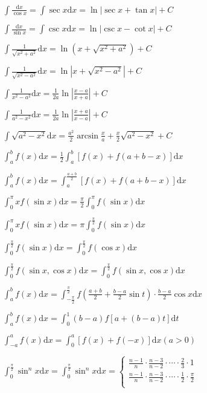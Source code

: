 \begin{spacing}{\hangju}
    \noindent $\int{\frac{\mathrm{d}x}{\cos{x}}} = \int{\sec{x}}\mathrm{d}x = \ln{\left| \sec{x} + \tan{x} \right| } + C$

    \noindent $\int{\frac{\mathrm{d}x}{\sin{x}}} = \int{\csc{x}}\mathrm{d}x = \ln{\left| \csc{x} - \cot{x} \right| } + C$

    \noindent $\int{\frac{1}{\sqrt{x^2 + a^2}}}\mathrm{d}x = \ln{(x + \sqrt{x^2 + a ^2})} + C$

    \noindent $\int{\frac{1}{\sqrt{x^2 - a^2}}}\mathrm{d}x = \ln{\left|x + \sqrt{x^2 - a ^2}\right|} + C$

    \noindent $\int{\frac{1}{x^2 - a^2}} \mathrm{d}x = \frac{1}{2a} \ln{\left| \frac{x - a}{x + a} \right|} + C$

    \noindent $\int{\frac{1}{a^2 - x^2}} \mathrm{d}x = \frac{1}{2a} \ln{\left| \frac{x + a}{x - a} \right|} + C$

    \noindent $\int{\sqrt{a^2 - x^2}}\mathrm{d}x = \frac{a^2}{2}\arcsin{\frac{x}{a}} + \frac{x}{2}\sqrt{a^2 - x^2} + C$

    \noindent $\int_{a}^{b}{f(x)}\mathrm{d}x = \frac{1}{2}\int_{a}^{b}{[f(x) + f(a + b - x)]}\mathrm{d}x$

    \noindent $\int_{a}^{b}{f(x)}\mathrm{d}x = \int_{a}^{\frac{a+b}{2}}{[f(x) + f(a + b - x)]}\mathrm{d}x$

    \noindent $\int_{0}^{\pi}{xf(\sin{x})}\mathrm{d}x = \frac{\pi}{2}\int_{0}^{\pi}{f(\sin{x})}\mathrm{d}x$

    \noindent $\int_{0}^{\pi}{xf(\sin{x})}\mathrm{d}x = \pi\int_{0}^{\frac{\pi}{2}}{f(\sin{x})}\mathrm{d}x$

    \noindent $\int_{0}^{\frac{\pi}{2}}{f(\sin{x})}\mathrm{d}x = \int_{0}^{\frac{\pi}{2}}{f(\cos{x})}\mathrm{d}x $

    \noindent $\int_{0}^{\frac{\pi}{2}}{f(\sin{x}, \cos{x})}\mathrm{d}x = \int_{0}^{\frac{\pi}{2}}{f(\sin{x}, \cos{x})}\mathrm{d}x $

    \noindent $\int_{a}^{b}{f(x)}\mathrm{d}x = \int_{-\frac{\pi}{2}}^{\frac{\pi}{2}}{f(\frac{a + b}{2} + \frac{b - a}{2}\sin{t}) \cdot \frac{b - a}{2}\cos{x}}\mathrm{d}x$

    \noindent $\int_{a}^{b}{f(x)}\mathrm{d}x = \int_{0}^{1}(b - a)f[a + (b - a)t]\mathrm{d}t$

    \noindent $\int_{-a}^{a}{f(x)}\mathrm{d}x = \int_{0}^{a}[f(x) + f(-x)]\mathrm{d}x (a > 0)$

    \noindent $\int_{0}^{\frac{\pi}{2}}{\sin^n{x}}\mathrm{d}x = \int_{0}^{\frac{\pi}{2}}{\sin^n{x}}\mathrm{d}x = \left\{ \begin{array}{l}
        \frac{n - 1}{n} \cdot \frac{n - 3}{n - 2} \cdot \cdots  \cdot \frac{2}{3} \cdot 1 \\
        \frac{n - 1}{n} \cdot \frac{n - 3}{n - 2} \cdot \cdots  \cdot \frac{1}{2} \cdot \frac{\pi}{2} \\
    \end{array}\right.$


\end{spacing}
